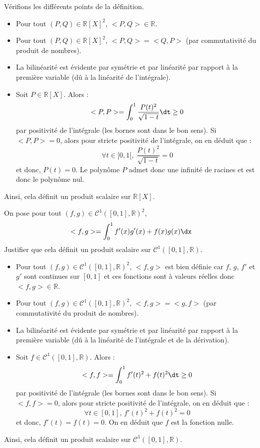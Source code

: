 \documentclass[a4paper,10pt]{report}
\begin{document}
\noindent Vérifions les différents points de la définition.

\begin{itemize}
\item Pour tout $(P,Q) \in \mathbb{R}[X]^2$, $<P,Q> \in \mathbb{R}$.
\item Pour tout $(P,Q) \in \mathbb{R}[X]^2$, $<P,Q>= <Q,P>$ (par commutativité du produit de nombres).
\item La bilinéarité est évidente par symétrie et par linéarité par rapport à la première variable (dû à la linéarité de l'intégrale).
\item Soit $P \in \mathbb{R}[X]$. Alors :
$$ <P,P> =\int_0^1 \dfrac{P(t)^2}{\sqrt{1-t}} \dt \geq 0$$
par positivité de l'intégrale (les bornes sont dans le bon sens). Si $<P,P>=0$, alors pour stricte positivité de l'intégrale, on en déduit que :
$$ \forall t \in [0,1[, \; \dfrac{P(t)^2}{\sqrt{1-t}}=0$$
et donc, $P(t)=0$. Le polynôme $P$ admet donc une infinité de racines et est donc le polynôme nul. 
\end{itemize}
Ainsi, cela définit un produit scalaire sur $\mathbb{R}[X]$.


\begin{Exa} \label{PS2} On pose pour tout $(f,g) \in \mathcal{C}^1([0,1],\mathbb{R})^2$,
$$ <f,g> = \int_{0}^1 f'(x)g'(x)+f(x)g(x) \dx$$
Justifier que cela définit un produit scalaire sur $\mathcal{C}^1([0,1],\mathbb{R})$.
\end{Exa} 

\corr 

\begin{itemize}
\item Pour tout $(f,g) \in \mathcal{C}^1([0,1],\mathbb{R})^2$, $<f,g>$ est bien définie car $f$, $g$, $f'$ et $g'$ sont continues sur $[0,1]$ et ces fonctions sont à valeurs réelles donc $<f,g> \in \mathbb{R}$.
\item Pour tout $(f,g) \in \mathcal{C}^1([0,1],\mathbb{R})^2$, $<f,g>= <g,f>$ (par commutativité du produit de nombres).
\item La bilinéarité est évidente par symétrie et par linéarité par rapport à la première variable (dû à la linéarité de l'intégrale et de la dérivation).
\item Soit $f \in \mathcal{C}^1([0,1],\mathbb{R})$. Alors :
$$ <f,f> =\int_0^1 f'(t)^2+f(t)^2 \dt \geq 0$$
par positivité de l'intégrale (les bornes sont dans le bon sens). Si $<f,f>=0$, alors pour stricte positivité de l'intégrale, on en déduit que :
$$ \forall t \in [0,1], \, f'(t)^2+f(t)^2=0$$
et donc, $f'(t)=f(t)=0$. On en déduit que $f$ est la fonction nulle. 
\end{itemize}
Ainsi, cela définit un produit scalaire sur $\mathcal{C}^1([0,1],\mathbb{R})$.
\end{document}
